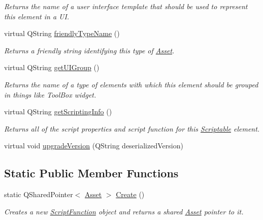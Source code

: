 \begin{DoxyCompactItemize}
\begin{DoxyCompactList}\small\item\em Returns the name of a user interface template that should be used to represent this element in a U\-I. \end{DoxyCompactList}\item 
virtual Q\-String \hyperlink{class_picto_1_1_script_function_a6dd0bc6a6aaeeff4b7ccc9238d4b6f1e}{friendly\-Type\-Name} ()
\begin{DoxyCompactList}\small\item\em Returns a friendly string identifying this type of \hyperlink{class_picto_1_1_asset}{Asset}. \end{DoxyCompactList}\item 
\hypertarget{class_picto_1_1_script_function_a62949934617959595d863623deb73dcc}{virtual Q\-String \hyperlink{class_picto_1_1_script_function_a62949934617959595d863623deb73dcc}{get\-U\-I\-Group} ()}\label{class_picto_1_1_script_function_a62949934617959595d863623deb73dcc}

\begin{DoxyCompactList}\small\item\em Returns the name of a type of elements with which this element should be grouped in things like Tool\-Box widget. \end{DoxyCompactList}\item 
virtual Q\-String \hyperlink{class_picto_1_1_script_function_a7584048defd3fb35a72bd5cece1c9f06}{get\-Scripting\-Info} ()
\begin{DoxyCompactList}\small\item\em Returns all of the script properties and script function for this \hyperlink{class_picto_1_1_scriptable}{Scriptable} element. \end{DoxyCompactList}\item 
virtual void \hyperlink{class_picto_1_1_script_function_a78841d2f9189ace5b828836b14006e31}{upgrade\-Version} (Q\-String deserialized\-Version)
\end{DoxyCompactItemize}
\subsection*{Static Public Member Functions}
\begin{DoxyCompactItemize}
\item 
\hypertarget{class_picto_1_1_script_function_afcb47161eb315e4b77f472b59792a76b}{static Q\-Shared\-Pointer$<$ \hyperlink{class_picto_1_1_asset}{Asset} $>$ \hyperlink{class_picto_1_1_script_function_afcb47161eb315e4b77f472b59792a76b}{Create} ()}\label{class_picto_1_1_script_function_afcb47161eb315e4b77f472b59792a76b}

\begin{DoxyCompactList}\small\item\em Creates a new \hyperlink{class_picto_1_1_script_function}{Script\-Function} object and returns a shared \hyperlink{class_picto_1_1_asset}{Asset} pointer to it. \end{DoxyCompactList}\end{DoxyCompactItemize}
